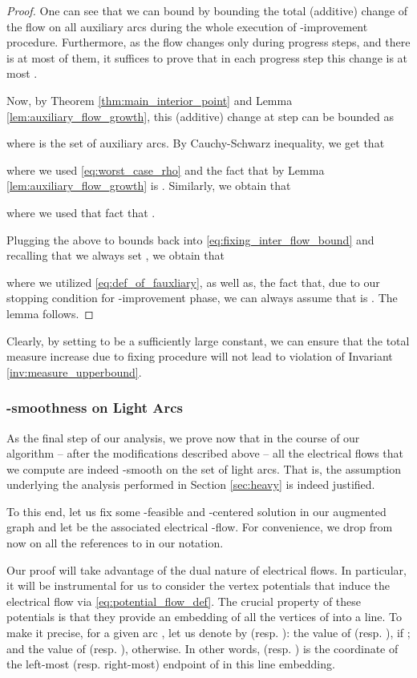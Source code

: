 \documentclass[11pt, letterpaper]{article}
\begin{document}
\begin{proof}
One can see that we can bound  by bounding the total (additive) change of the flow  on all auxiliary arcs during the whole execution of -improvement procedure. Furthermore, as the flow  changes only during progress steps, and there is at most  of them, it suffices to prove that in each progress step this change is at most . 

Now, by Theorem \ref{thm:main_interior_point} and Lemma \ref{lem:auxiliary_flow_growth}, this (additive) change at step  can be bounded as

where  is the set of auxiliary arcs. By Cauchy-Schwarz inequality, we get that 
 
where we used \eqref{eq:worst_case_rho} and the fact that by Lemma \ref{lem:auxiliary_flow_growth}  is . Similarly, we obtain that

where we used that fact that . 

Plugging the above to bounds back into \eqref{eq:fixing_inter_flow_bound} and recalling that we always set , we obtain that


where we utilized \eqref{eq:def_of_fauxliary}, as well as, the fact that, due to our stopping condition for -improvement phase, we can always assume that  is . The lemma follows.
\end{proof}

Clearly, by setting  to be a sufficiently large constant, we can ensure that the total measure increase due to fixing procedure will not lead to violation of Invariant \ref{inv:measure_upperbound}.

\subsubsection*{-smoothness on Light Arcs}\label{sec:smoothness}

As the final step of our analysis, we prove now that in the course of our algorithm -- after the modifications described above -- all the electrical flows  that we compute are indeed -smooth on the set of light arcs. That is, the assumption underlying the analysis performed in Section \ref{sec:heavy} is indeed justified.

To this end, let us fix some -feasible and -centered solution  in our augmented graph  and let  be the associated electrical -flow. For convenience, we drop from now on all the references to  in our notation. 

Our proof will take advantage of the dual nature of electrical flows. In particular, it will be instrumental for us to consider the vertex potentials  that induce the electrical flow  via \eqref{eq:potential_flow_def}. The crucial property of these potentials is that they provide an embedding of all the vertices of  into a line. To make it precise, for a given arc , let us denote by  (resp. ): the value of  (resp. ), if ; and the value of  (resp. ), otherwise. In other words,  (resp. ) is the coordinate of the left-most (resp. right-most) endpoint of  in this line embedding. 
\end{document}
